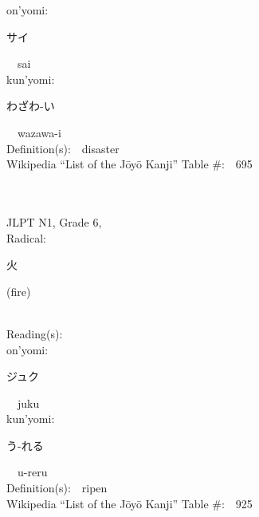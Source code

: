 \begin{multicols}{2}
{\hspace*{1em}}on'yomi:\ \ \\
{\hspace*{2em}}{\begin{CJK}{UTF8}{min} サイ \end{CJK}}\ \ sai\ \ \\
{\hspace*{1em}}kun'yomi:\ \ \\
{\hspace*{2em}}{\begin{CJK}{UTF8}{min} わざわ-い \end{CJK}}\ \ wazawa-i\ \ \\
Definition(s):\ \ disaster \\
Wikipedia ``List of the J\=oy\=o Kanji'' Table \#:\ \ 695 \\
\ \ \\
{\fontsize{34pt}{40pt}  }\ \ \\  %
{JLPT N1, Grade 6, \\Radical:\ \ {\begin{CJK}{UTF8}{min} 火 \end{CJK}} (fire) } \\
Reading(s):\ \ \\
{\hspace*{1em}}on'yomi:\ \ \\
{\hspace*{2em}}{\begin{CJK}{UTF8}{min} ジュク \end{CJK}}\ \ juku\ \ \\
{\hspace*{1em}}kun'yomi:\ \ \\
{\hspace*{2em}}{\begin{CJK}{UTF8}{min} う-れる \end{CJK}}\ \ u-reru\ \ \\
Definition(s):\ \ ripen \\
Wikipedia ``List of the J\=oy\=o Kanji'' Table \#:\ \ 925 \\
\ \ \\
{\fontsize{34pt}{40pt}  }\ \ \\  %

\end{multicols}
